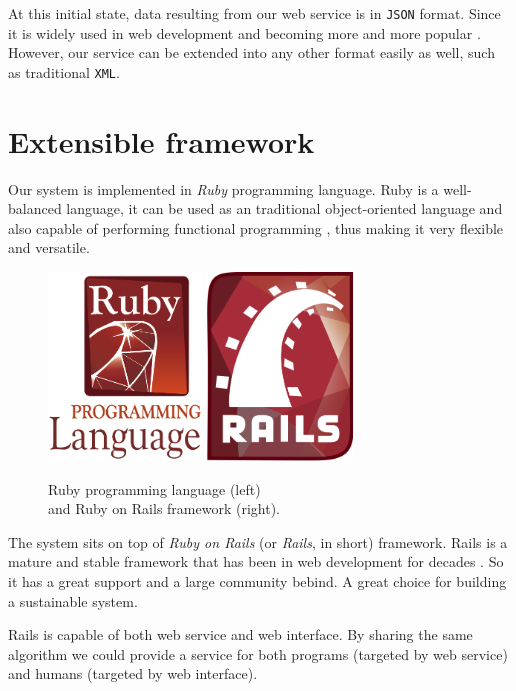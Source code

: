 At this initial state, data resulting from our web service
is in \texttt{JSON} \cite{json} format. Since it is widely used in web development
and becoming more and more popular \cite{rest}. However, our service can be extended
into any other format easily as well, such as traditional \texttt{XML}.

\section{Extensible framework}


Our system is implemented in \emph{Ruby} \cite{ruby} programming language.
Ruby is a well-balanced language, it can be used as an traditional
object-oriented language \cite{rubyoo} and also capable of performing
functional programming \cite[]{rubyfp}, thus making it very flexible and versatile.

\begin{figure}
\centering
\captionsetup{justification=centering}
\includegraphics[height=5cm]{gfx/ruby}
\hspace{0.5cm}
\includegraphics[height=5cm]{gfx/ror}
\caption[Ruby and Ruby on Rails]{Ruby programming language (left) \\
and Ruby on Rails framework (right).}
\end{figure}


The system sits on top of \emph{Ruby on Rails}
(or \emph{Rails}, in short) \cite{rails} framework.
Rails is a mature and stable framework that has been in
web development for decades \cite[]{railsd}. So it has a great support
and a large community bebind. A great choice for building a sustainable
system.

Rails is capable of both web service and web interface.
By sharing the same algorithm we could provide a service
for both programs (targeted by web service) and humans
(targeted by web interface).

